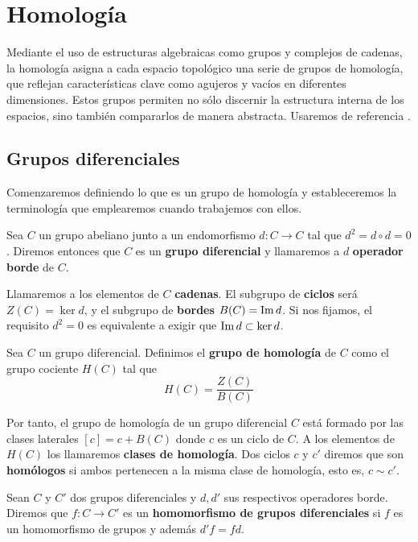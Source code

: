 
\chapter{Homología}

Mediante el uso de estructuras algebraicas como grupos y complejos de cadenas, la homología asigna a cada espacio topológico una serie de grupos de homología, que reflejan características clave como agujeros y vacíos en diferentes dimensiones. Estos grupos permiten no sólo discernir la estructura interna de los espacios, sino también compararlos de manera abstracta. Usaremos de referencia \cite{maclane2012homology}.

\section{Grupos diferenciales}

Comenzaremos definiendo lo que es un grupo de homología y estableceremos la terminología que emplearemos cuando trabajemos con ellos.

\begin{definicion}
	Sea $C$ un grupo abeliano junto a un endomorfismo  $d: C \rightarrow C$ tal que $d^2 = d \circ d = 0$. Diremos entonces que $C$ es un \textbf{grupo diferencial} y llamaremos a $d$ \textbf{operador borde} de $C$.
\end{definicion}

Llamaremos a los elementos de $C$ \textbf{cadenas}. El subgrupo de \textbf{ciclos} será $Z(C) = \ker d$,  y el subgrupo de \textbf{bordes} $B(C) = \operatorname{Im} d$. Si nos fijamos, el requisito $d^2 = 0$ es equivalente a exigir que $\operatorname{Im}{d} \subset \ker{d}$.

\begin{definicion}
	Sea $C$ un grupo diferencial. Definimos el \textbf{grupo de homología} de $C$ como el grupo cociente $H(C)$ tal que 
	\[ H(C) = \frac{Z(C)}{B(C)}\]
\end{definicion}

Por tanto, el grupo de homología de un grupo diferencial $C$ está formado por las clases laterales $[c] = c + B(C)$ donde $c$ es un ciclo de $C$. A los elementos de $H(C)$ los llamaremos \textbf{clases de homología}. Dos ciclos $c$ y $c'$ diremos que son \textbf{homólogos} si ambos pertenecen a la misma clase de homología, esto es, $c \sim c'$.

\begin{definicion}
	Sean $C$ y $C'$ dos grupos diferenciales y $d, d'$ sus respectivos operadores borde. Diremos que $f: C \rightarrow C'$ es un \textbf{homomorfismo de grupos diferenciales} si $f$ es un homomorfismo de grupos y además $d'f = fd$.
\end{definicion}

